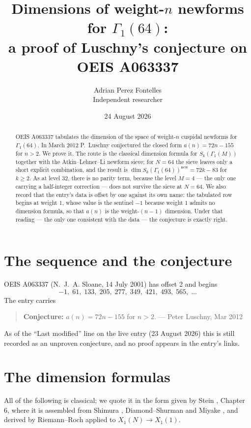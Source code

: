 \documentclass[11pt,a4paper]{article}
\title{Dimensions of weight-$n$ newforms for $\Gamma_{1}(64)$:\\
a proof of Luschny's conjecture on OEIS A063337}
\author{Adrian Perez Fontelles\\ \small Independent researcher}
\date{24 August 2026}
\theoremstyle{plain}
\theoremstyle{definition}
\begin{document}
\maketitle

\begin{abstract}
OEIS A063337 tabulates the dimension of the space of weight-$n$ cuspidal newforms for
$\Gamma_{1}(64)$. In March 2012 P.~Luschny conjectured the closed form $a(n)=72n-155$ for
$n>2$. We prove it. The route is the classical dimension formula for $S_{k}(\Gamma_{1}(M))$
together with the Atkin--Lehner--Li newform sieve; for $N=64$ the sieve leaves only a short
explicit combination, and the result is $\dim S_{k}(\Gamma_{1}(64))^{\mathrm{new}}=72k-83$
for $k\ge2$. As at level 32, there is no parity term, because the level $M=4$ --- the only
one carrying a half-integer correction --- does not survive the sieve at $N=64$. We also record that the
entry's data is offset by one against its own name: the tabulated row begins at weight 1,
whose value is the sentinel $-1$ because weight 1 admits no dimension formula, so that
$a(n)$ is the weight-$(n-1)$ dimension. Under that reading --- the only one consistent with
the data --- the conjecture is exactly right.
\end{abstract}

\section{The sequence and the conjecture}

OEIS A063337 (N.~J.~A. Sloane, 14 July 2001) has offset 2 and begins
\[
  -1,\;61,\;133,\;205,\;277,\;349,\;421,\;493,\;565,\;\dots
\]
The entry carries

\begin{quote}
\textbf{Conjecture:} $a(n)=72n-155$ for $n>2$. --- Peter Luschny, Mar 2012
\end{quote}

As of the ``Last modified'' line on the live entry (23 August 2026) this is still recorded
as an unproven conjecture, and no proof appears in the entry's links.

\section{The dimension formulas}

All of the following is classical; we quote it in the form given by Stein \cite{stein},
Chapter 6, where it is assembled from Shimura \cite[\S2.6]{shimura}, Diamond--Shurman
\cite[Ch.~3]{ds} and Miyake \cite[\S2.5]{miyake}, and derived by Riemann--Roch applied to
$X_{1}(N)\to X_{1}(1)$.
\end{document}
